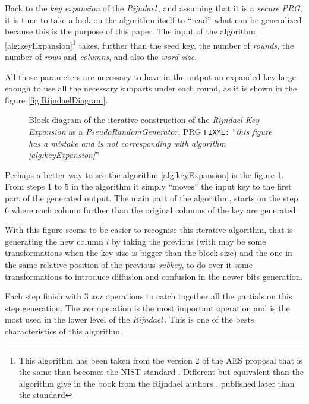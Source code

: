 \documentclass[10pt,a4paper,twoside]{llncs}
\newcommand{\fixme}[1]{\texttt{\color{red}FIXME:} ``\emph{#1}''}
\newcommand{\rijndael}{\emph{Rijndael}}
\begin{document}
Back to the \emph{key expansion} of the \rijndael\,, and assuming that it is a \emph{secure PRG}, it is time to take a look on the algorithm itself to ``read'' what can be generalized because this is the purpose of this paper. The input of the algorithm \ref{alg:keyExpansion}\footnote{This algorithm has been taken from the version 2 of the AES proposal \cite{Daemen01aes-ammended} that is the same than becomes the NIST standard \cite{AES-FIPS}. Different but equivalent than the algorithm give in the book from the Rijndael authors \cite{Daemen:2002:DR:560131}, published later than the standard} takes, further than the seed key, the number of \emph{rounds}, the number of \emph{rows} and \emph{columns}, and also the \emph{word size}.

All those parameters are necessary to have in the output an expanded key large enough to use all the necessary subparts under each round, as it is shown in the figure \ref{fig:RijndaelDiagram}.

\begin{figure}[ht]
\begin{center}

\caption{Block diagram of the iterative construction of the \emph{Rijndael Key Expansion} as a \emph{PseudoRandomGenerator}, PRG \fixme{this figure has a mistake and is not corresponding with algorithm \ref{alg:keyExpansion}}}
\label{fig:keyExpansionDiagram}
\end{center}
\end{figure}

Perhaps a better way to see the algorithm \ref{alg:keyExpansion} is the figure \ref{fig:keyExpansionDiagram}. From steps 1 to 5 in the algorithm it simply ``moves'' the input key to the first part of the generated output. The main part of the algorithm, starts on the step 6 where each column further than the original columns of the key are generated.

With this figure seems to be easier to recognise this iterative algorithm, that is generating the new column $i$ by taking the previous (with may be some transformations when the key size is bigger than the block size) and the one in the same relative position of the previous \emph{subkey}, to do over it some transformations to introduce diffusion and confusion in the newer bits generation.

Each step finish with 3 \emph{xor} operations to catch together all the partials on this step generation. The \emph{xor} operation is the most important operation and is the most used in the lower level of the \rijndael\,. This is one of the bests characteristics of this algorithm.
\end{document}
